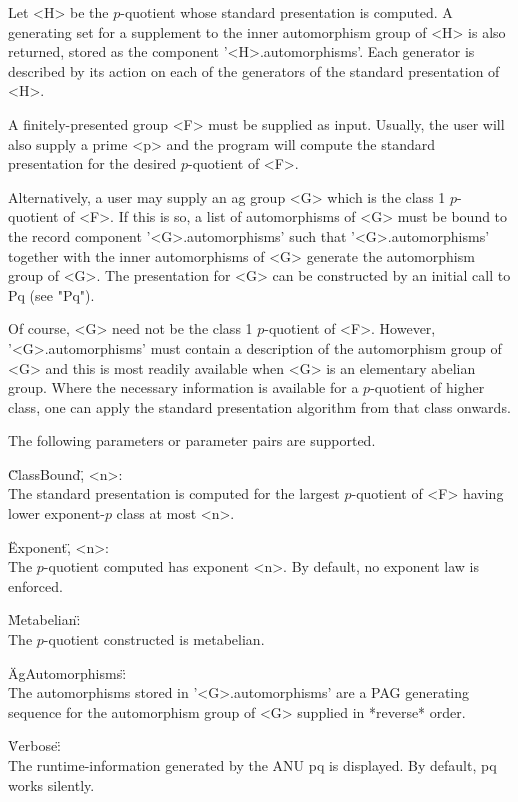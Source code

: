 Let <H> be the  $p$-quotient whose standard presentation is  computed.  A
generating set for a supplement to the inner automorphism group of <H> is
also  returned,   stored  as  the  component  '<H>.automorphisms'.   Each
generator is described by  its  action on  each of the generators  of the
standard presentation of <H>.

A  finitely-presented group <F> must be  supplied  as input. Usually, the
user will  also  supply a prime  <p> and  the  program will  compute  the
standard presentation for the desired $p$-quotient of <F>.

Alternatively,  a  user may supply an ag group <G> which  is the class  1
$p$-quotient of <F>. If  this is  so, a list of automorphisms of <G> must
be   bound  to   the   record  component  '<G>.automorphisms'  such  that
'<G>.automorphisms' together with the inner automorphisms of <G> generate
the  automorphism  group  of  <G>.   The  presentation  for  <G>  can  be
constructed by an initial call to Pq (see "Pq").

Of  course, <G> need  not be the class  1 $p$-quotient of <F>.   However,
'<G>.automorphisms' must contain a description of the  automorphism group
of  <G>  and this is  most readily  available when  <G> is  an elementary
abelian  group.   Where the  necessary information  is  available  for  a
$p$-quotient of higher class,  one  can  apply  the standard presentation
algorithm from that class onwards.

The following parameters or parameter pairs are supported.

\"ClassBound\", <n>: \\
    The  standard presentation is  computed for  the largest $p$-quotient
    of <F> having lower exponent-$p$ class at most <n>.

\"Exponent\", <n>: \\
    The $p$-quotient computed has  exponent <n>.  By default, no exponent
    law is enforced.

\"Metabelian\": \\
    The $p$-quotient constructed is metabelian.

\"AgAutomorphisms\": \\
    The automorphisms stored in '<G>.automorphisms' are  a PAG generating
    sequence  for the automorphism group  of  <G>  supplied  in *reverse*
    order.

\"Verbose\": \\
    The  runtime-information generated by  the  ANU  pq is displayed.  By
    default, pq works silently.

